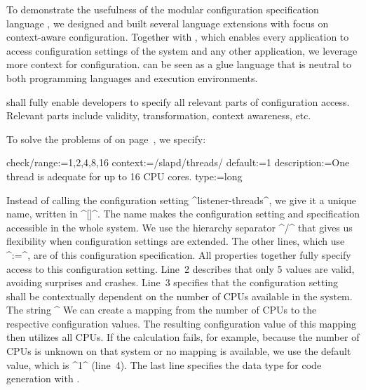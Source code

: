 To demonstrate the usefulness of the modular configuration specification language , we designed and built several language extensions with focus on context-aware configuration.
Together with \elektra{}, which enables every application to access configuration settings of the system and any other application, we leverage more context for configuration.
 can be seen as a glue language that is neutral to both programming languages and execution environments.

 shall fully enable developers to specify all relevant parts of configuration access.
Relevant parts include validity, transformation, context awareness, etc.
\begin{example}
\label{ex:introduction-solution}
To solve the problems of  on page~\pageref{ex:introduction-openldap-crash}, we specify:

\begin{code}
  check/range:=1,2,4,8,16
  context:=/slapd/threads/%
  default:=1
  description:=One thread is adequate for up to 16 CPU cores.
  type:=long
\end{code}


Instead of calling the configuration setting ^listener-threads^, we give it a unique name, written in ^[]^.
The name makes the configuration setting and specification accessible in the whole system.
We use the hierarchy separator ^/^ that gives us flexibility when configuration settings are extended.
The other lines, which use ^:=^, are  of this configuration specification.
All properties together fully specify access to this configuration setting.
Line~2 describes that only 5 values are valid, avoiding surprises and crashes.
Line~3 specifies that the configuration setting shall be contextually dependent on the number of CPUs available in the system.
The string ^%
We can create a mapping from the number of CPUs to the respective configuration values.
The resulting configuration value of this mapping then utilizes all CPUs.
If the calculation fails, for example, because the number of CPUs is unknown on that system or no mapping is available, we use the default value, which is ^1^ (line~4).
The last line specifies the data type for code generation with .
\end{example}

